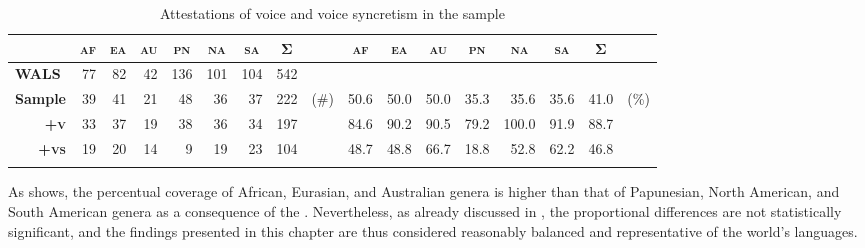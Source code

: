 \begin{table}
	\setlength{\tabcolsep}{2.2pt}
	\begin{tabularx}{\textwidth}{lrrrrrrrlrrrrrrrl}
		\lsptoprule
		& \multicolumn{1}{c}{\textbf{\textsc{af}}} & \multicolumn{1}{c}{\textbf{\textsc{ea}}} & \multicolumn{1}{c}{\textbf{\textsc{au}}} & \multicolumn{1}{c}{\textbf{\textsc{pn}}} & \multicolumn{1}{c}{\textbf{\textsc{na}}} & \multicolumn{1}{c}{\textbf{\textsc{sa}}} & \multicolumn{1}{c}{\textbf{Σ}} & & \multicolumn{1}{c}{\textbf{\textsc{af}}} & \multicolumn{1}{c}{\textbf{\textsc{ea}}} & \multicolumn{1}{c}{\textbf{\textsc{au}}} & \multicolumn{1}{c}{\textbf{\textsc{pn}}} & \multicolumn{1}{c}{\textbf{\textsc{na}}} & \multicolumn{1}{c}{\textbf{\textsc{sa}}} & \multicolumn{1}{c}{\textbf{Σ}} & \\
		\midrule
		\textbf{WALS} & 77 & 82 & 42 & 136 & 101 & 104 & 542 & & & & & & & & & \\
		\midrule
		\textbf{Sample} & 39 & 41 & 21 & 48 & 36 & 37 & 222 & (\#) & 50.6 & 50.0 & 50.0 & 35.3 & 35.6 & 35.6 & 41.0 & (\%) \\
		\multicolumn{1}{r}{\textbf{+\textsc{v}}} & 33 & 37 & 19 & 38 & 36 & 34 & 197 & & 84.6 & 90.2 & 90.5 & 79.2 & 100.0 & 91.9 & 88.7 & \\
		\multicolumn{1}{r}{\textbf{+\textsc{vs}}} & 19 & 20 & 14 & 9 & 19 & 23 & 104 & & 48.7 & 48.8 & 66.7 & 18.8 & 52.8 & 62.2 & 46.8 &\\
		\lspbottomrule
	\end{tabularx}
	\caption{Attestations of voice and voice syncretism in the sample}
	\label{tab:ch6:voice-syncretism}
\end{table} 

As  shows, the percentual coverage of African, Eurasian, and Australian genera is higher than that of Papunesian, North American, and South American genera as a consequence of the . Nevertheless, as already discussed in , the proportional differences are not statistically significant, and the findings presented in this chapter are thus considered reasonably balanced and representative of the world’s languages. 

